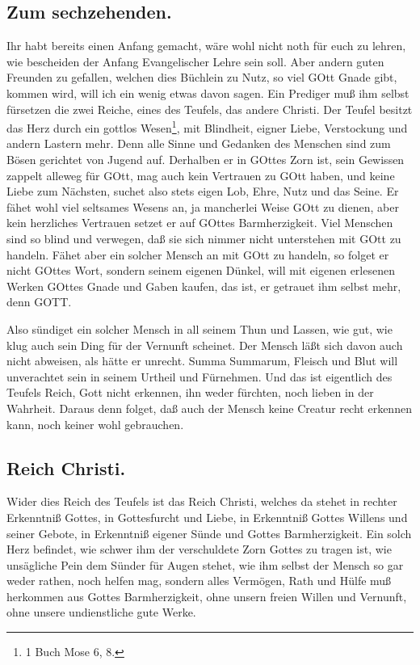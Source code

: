 \subsection*{Zum sechzehenden.}

Ihr habt bereits einen Anfang gemacht, wäre wohl nicht noth für euch zu lehren, wie bescheiden der Anfang Evangelischer Lehre sein soll. Aber andern guten Freunden zu gefallen, welchen dies Büchlein zu Nutz, so viel GOtt Gnade gibt, kommen wird, will ich ein wenig etwas davon sagen. Ein Prediger muß ihm selbst fürsetzen die zwei Reiche, eines des Teufels, das andere Christi. Der Teufel besitzt das Herz durch ein gottlos Wesen\footnote{1 Buch Mose 6, 8.}, mit Blindheit, eigner Liebe, Verstockung und andern Lastern mehr. Denn alle Sinne und Gedanken des Menschen sind zum Bösen gerichtet von Jugend auf. Derhalben er in GOttes Zorn ist, sein Gewissen zappelt alleweg für GOtt, mag auch kein Vertrauen zu GOtt haben, und keine Liebe zum Nächsten, suchet also stets eigen Lob, Ehre, Nutz und das Seine. Er fähet wohl viel seltsames Wesens an, ja mancherlei Weise GOtt zu dienen, aber kein herzliches Vertrauen setzet er auf GOttes Barmherzigkeit. Viel Menschen sind so blind und verwegen, daß sie sich nimmer nicht unterstehen mit GOtt zu handeln. Fähet aber ein solcher Mensch an mit GOtt zu handeln, so folget er nicht GOttes Wort, sondern seinem eigenen Dünkel, will mit eigenen erlesenen Werken GOttes Gnade und Gaben kaufen, das ist, er getrauet ihm selbst mehr, denn GOTT.

Also sündiget ein solcher Mensch in all seinem Thun und Lassen, wie gut, wie klug auch sein Ding für der Vernunft scheinet. Der Mensch läßt sich davon auch nicht abweisen, als hätte er unrecht. Summa Summarum, Fleisch und Blut will unverachtet sein in seinem Urtheil und Fürnehmen. Und das ist
eigentlich des Teufels Reich, Gott nicht erkennen, ihn weder fürchten, noch lieben in der Wahrheit. Daraus denn folget, daß auch der Mensch keine Creatur recht erkennen kann, noch keiner wohl gebrauchen.

\subsection*{Reich Christi.}

Wider dies Reich des Teufels ist das Reich Christi, welches da stehet in rechter Erkenntniß Gottes, in Gottesfurcht und Liebe, in Erkenntniß Gottes Willens und seiner Gebote, in Erkenntniß eigener Sünde und Gottes Barmherzigkeit. Ein solch Herz befindet, wie schwer ihm der verschuldete Zorn Gottes zu tragen ist, wie unsägliche Pein dem Sünder für Augen stehet, wie ihm selbst der Mensch so gar weder rathen, noch helfen mag, sondern alles Vermögen, Rath und Hülfe muß herkommen aus Gottes Barmherzigkeit, ohne unsern freien Willen und Vernunft, ohne unsere undienstliche gute Werke.

